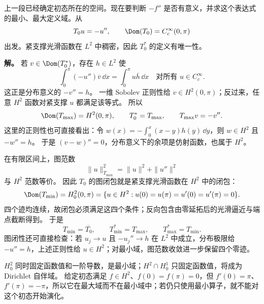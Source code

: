 \begin{exbox}
上一段已经确定初态所在的空间。现在要判断 $-f''$ 是否有意义，并求这个表达式的最小、最大定义域。从
\[
 T_0u=-u'',\qquad \Dom(T_0)=C_c^\infty(0,\pi)
\]
出发。紧支撑光滑函数在 $L^2$ 中稠密，因此 $T_0^*$ 的定义有唯一性。

\textbf{解。} 若 $v\in\Dom(T_0^*)$，存在 $h\in L^2$ 使
\[
 \int_0^\pi(-u'')\overline v\,\dd x
 =\int_0^\pi u\overline h\,\dd x
 \quad\text{对所有 }u\in C_c^\infty.
\]
这正是分布意义的 $-v''=h$。
一维 Sobolev 正则性给 $v\in H^2(0,\pi)$；反过来，任意 $H^2$ 函数对紧支撑 $u$ 都满足该等式。
所以
\[
 \Dom(T_{\max})=H^2(0,\pi),\qquad
 T_0^*=T_{\max},\qquad T_{\max}v=-v''.
\]
这里的正则性也可直接看出：令 $w(x)=-\int_0^x(x-y)h(y)\,\dd y$，则 $w\in H^2$ 且 $-w''=h$。
于是 $(v-w)''=0$，分布意义下的余项是仿射函数，也属于 $H^2$。

在有限区间上，图范数
\[
 \|u\|_{T_{\max}}^2=\|u\|^2+\|u''\|^2
\]
与 $H^2$ 范数等价。
因此 $T_0$ 的图闭包就是紧支撑光滑函数在 $H^2$ 中的闭包：
\[
 \Dom(T_{\min})=H_0^2(0,\pi)
 =\{u\in H^2:u(0)=u(\pi)=u'(0)=u'(\pi)=0\}.
\]
四个迹均连续，故闭包必须满足这四个条件；反向包含由零延拓后的光滑逼近与端点截断得到。
于是
\[
 T_{\min}=\overline{T_0},\qquad
 T_{\min}^*=T_{\max},\qquad T_{\max}^*=T_{\min}.
\]
图闭性还可直接检查：若 $u_j\to u$ 且 $-u_j''\to h$ 在 $L^2$ 中成立，分布极限给 $-u''=h$，上述正则性给 $u\in H^2$；对最小域，图范数收敛进一步保留四个零迹。

$H_0^2$ 同时固定函数值和一阶导数，是最小域；$H^2\cap H_0^1$ 只固定函数值，将成为 Dirichlet 自伴域。
给定初态满足 $f\in H^2$、$f(0)=f(\pi)=0$，但 $f'(0)=\pi$、$f'(\pi)=-\pi$，所以它在最大域而不在最小域中；若仍只使用最小算子，就不能对这个初态开始演化。
\end{exbox}

